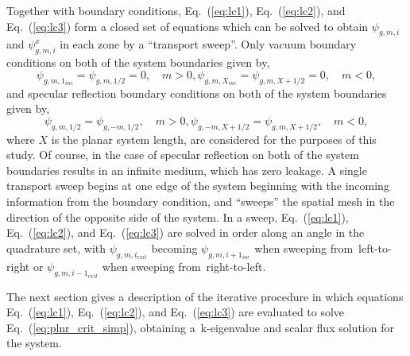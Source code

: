 \noindent 
	\indent Together with boundary conditions, Eq.~(\ref{eq:lc1}), Eq.~(\ref{eq:lc2}), and
	Eq.~(\ref{eq:lc3}) form a closed set of equations which can be solved to obtain $\psi_{g,m,i}$
	and $\psi_{g,m,i}^{x}$ in each zone by a ``transport sweep''.  Only vacuum boundary conditions
	on both of the system boundaries given by,
\begin{subequations}
	\begin{equation}
		\psi_{g,m,1_{inc}} = \psi_{g,m,1/2} = 0, \quad m > 0,
	\end{equation}
	\begin{equation}
		\psi_{g,m,X_{inc}} = \psi_{g,m,X+1/2} = 0, \quad m < 0,
	\end{equation}
	\label{eq:bc-vacuum}
\end{subequations}
 	and specular reflection boundary conditions on both of the system boundaries given by,
\begin{subequations}
	\begin{equation}
		\psi_{g,m,1/2} = \psi_{g,-m,1/2}, \quad m > 0,
	\label{eq:bc-reflect-L}
	\end{equation}
	\begin{equation}
		\psi_{g,-m,X+1/2} = \psi_{g,m,X+1/2}, \quad m < 0,
	\label{eq:bc-reflect-R}
	\end{equation}
	\label{eq:bc-reflect}
\end{subequations}
	where ${X}$ is the planar system length, are considered for the purposes of this study.  Of course, 
	in the case of specular reflection on both of the system boundaries results in an infinite 
	medium, which has zero leakage.  A single 
	transport sweep begins at one edge of the system beginning with the incoming information
	from the boundary condition, and ``sweeps'' the spatial mesh in the direction of the opposite
	side of the system.  In a sweep, Eq.~(\ref{eq:lc1}), Eq.~(\ref{eq:lc2}), and Eq.~(\ref{eq:lc3})
	are solved in order along an angle in the quadrature set, with $\psi_{g,m,i_{exit}}$ becoming
	$\psi_{g,m,i+1_{inc}}$ when sweeping from~left-to-right or $\psi_{g,m,i-1_{exit}}$ when
	sweeping from~right-to-left.

\noindent
	\indent The next section gives a description of the iterative procedure in which equations
	Eq.~(\ref{eq:lc1}), Eq.~(\ref{eq:lc2}), and Eq.~(\ref{eq:lc3}) are evaluated to solve
	Eq.~(\ref{eq:plnr_crit_simp}), obtaining a~k-eigenvalue and scalar flux solution for 
	the system.
	
\belowSubSecSkip

